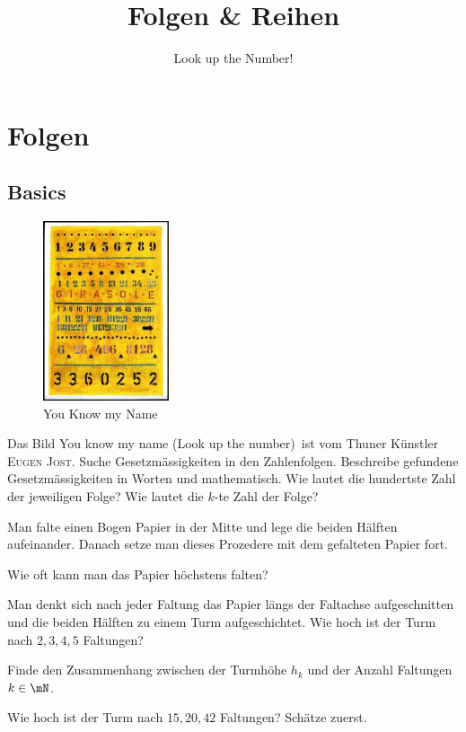 \documentclass[%
11pt,%
twoside,%
titlepage,%
german,%
headsepline%
]{scrartcl}
\title{Folgen \& Reihen}
\subtitle{Look up the Number!}
\author{}
\date{}
\begin{document}
\maketitle
\tableofcontents
\cleardoublepage

\section{Folgen}

\subsection{Basics}
\begin{figure}
\vspace{-2pt}
  \begin{center}
    \includegraphics[width=0.33\textwidth]{pictures/ejost}
  \end{center}
\caption{You Know my Name}
\vspace{-30pt}
\end{figure}
Das Bild \glqq You know my name (Look up the number)\grqq\ ist vom Thuner K\"unstler \textsc{Eugen Jost}. Suche Gesetzm\"assigkeiten in den Zahlenfolgen.
Beschreibe gefundene Gesetzm\"assigkeiten in Worten und mathematisch. Wie lautet die hundertste Zahl der jeweiligen Folge? Wie lautet die $k$-te Zahl der Folge?

\begin{ueb}
Man falte einen Bogen Papier in der Mitte und lege die beiden H\"alften aufeinander. Danach setze man dieses Prozedere mit dem gefalteten Papier fort.
\begin{enumeratea}
\item Wie oft kann man das Papier h\"och\-stens falten?
\item Man denkt sich nach jeder Faltung das Papier l\"angs der Falt\-achse aufgeschnitten und die beiden H\"alf\-ten zu einem Turm aufgeschichtet. Wie hoch ist der Turm nach $2,3,4,5$ Faltungen?
\item Finde den Zusammenhang zwischen der Turm\-h\"ohe $h_k$ und der Anzahl Faltungen $k\in\mN$.
\item Wie hoch ist der Turm nach $15,20,42$ Faltungen? Sch\"at\-ze zuerst.
\end{enumeratea}
\end{ueb}
\end{document}
